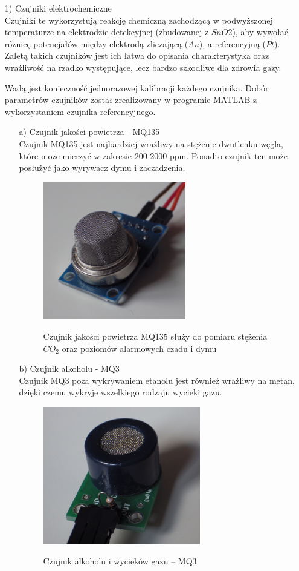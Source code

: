 \documentclass[12pt,a4paper]{article}
\begin{document}
\begin{enumerate}
	\item[1)] Czujniki elektrochemiczne\\
	Czujniki te wykorzystują reakcję chemiczną zachodzącą w podwyższonej temperaturze na elektrodzie detekcyjnej (zbudowanej z $SnO2$), aby wywołać różnicę potencjałów między elektrodą zliczającą ($Au$), a referencyjną ($Pt$). Zaletą takich czujników jest ich łatwa do opisania charakterystyka oraz wrażliwość na rzadko występujące, lecz bardzo szkodliwe dla zdrowia gazy. 

	Wadą jest konieczność jednorazowej kalibracji każdego czujnika. Dobór parametrów czujników został zrealizowany w programie MATLAB z wykorzystaniem czujnika referencyjnego.

\newpage

	\begin{enumerate}
		\item[a)] Czujnik jakości powietrza - MQ135 \\
		Czujnik MQ135 jest najbardziej wrażliwy na stężenie dwutlenku węgla, które może mierzyć w zakresie 200-2000 ppm. Ponadto czujnik ten może posłużyć jako wyrywacz dymu i zaczadzenia.
		
\begin{figure}[!h]
	\centering
	\includegraphics[height =60mm]{MQ135.jpg}
	\label{MQ135}
	\caption{Czujnik jakości powietrza MQ135 służy do pomiaru stężenia $CO_2$ oraz poziomów alarmowych czadu i dymu}
\end{figure}

		\item[b)] Czujnik alkoholu - MQ3 \\	
		Czujnik MQ3 poza wykrywaniem etanolu jest również wrażliwy na metan, dzięki czemu wykryje wszelkiego rodzaju wycieki gazu.
		
\begin{figure}[!h]	
\centering
	\includegraphics[height =60mm]{MQ3.jpg}
	\label{MQ3}
	\caption{Czujnik alkoholu i wycieków gazu -- MQ3}
\end{figure}		
	

\end{enumerate}
\end{enumerate}
\end{document}
